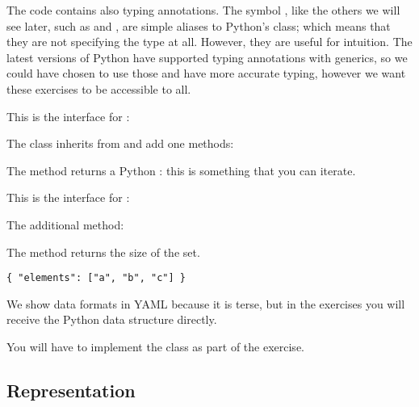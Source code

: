 The code contains also typing annotations.
The symbol , like the others we will see later, such as  and , are simple aliases to Python's  class; which means that they are not specifying the type at all.
However, they are useful for intuition.
The latest versions of Python have supported typing annotations with generics, so we could have chosen to use those and have more accurate typing, however we want these exercises to be accessible to all.


This is the interface for :

\begin{longcode}
\caption{}
\label{lst:EnumerableSet}
\end{longcode}

The class inherits from \Setoid and add one methods:
\begin{compactitem}
  \item The method  returns a Python : this is something that you can iterate.
\end{compactitem}
This is the interface for \FiniteSet:

\begin{longcode}
\caption{}
\label{lst:FiniteSet}
\end{longcode}

The additional method:
\begin{compactitem}
  \item The method  returns the size of the set.
\end{compactitem}


\begin{marginfigure}
\begin{verbatim}
{ "elements": ["a", "b", "c"] }
\end{verbatim}
\caption{We show data formats in YAML because it is terse, but in the exercises
you will receive the Python data structure directly.}
\label{fig:as-python}
\end{marginfigure}


You will have to implement the \FiniteSet class as part of the exercise.


\subsection*{Representation}

